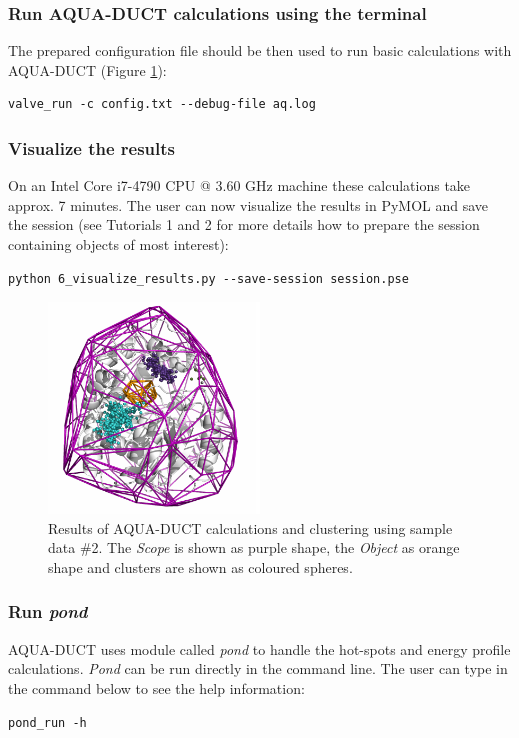 \documentclass[9pt,tutorial]{livecoms}
\begin{document}
\subsubsection{Run AQUA-DUCT calculations using the terminal}
The prepared configuration file should be then used to run basic calculations with AQUA-DUCT (Figure \ref{Tut4.1}):
\begin{lstlisting}
valve_run -c config.txt --debug-file aq.log
\end{lstlisting}

\subsubsection{Visualize the results}
On an Intel Core i7-4790 CPU @ 3.60 GHz machine these calculations take approx. 7 minutes. 
The user can now visualize the results in PyMOL and save the session (see Tutorials 1 and 2 for more details how to prepare the session containing objects of most interest):
\begin{lstlisting}
python 6_visualize_results.py --save-session session.pse
\end{lstlisting}

\begin{figure}[ht!]
\centering
\includegraphics[width=0.5\textwidth]{Tut4.1.png}
\caption{Results of AQUA-DUCT calculations and clustering using sample data \#2. The \emph{Scope} is shown as purple shape, the \emph{Object} as orange shape and clusters are shown as coloured spheres.}
\label{Tut4.1}
\end{figure}

\subsubsection{Run \emph{pond}}
AQUA-DUCT uses module called \textit{pond} to handle the hot-spots and energy profile calculations. \textit{Pond} can be run directly in the command line. The user can type in the command below to see the help information:
\begin{lstlisting}
pond_run -h
\end{lstlisting}
\end{document}
